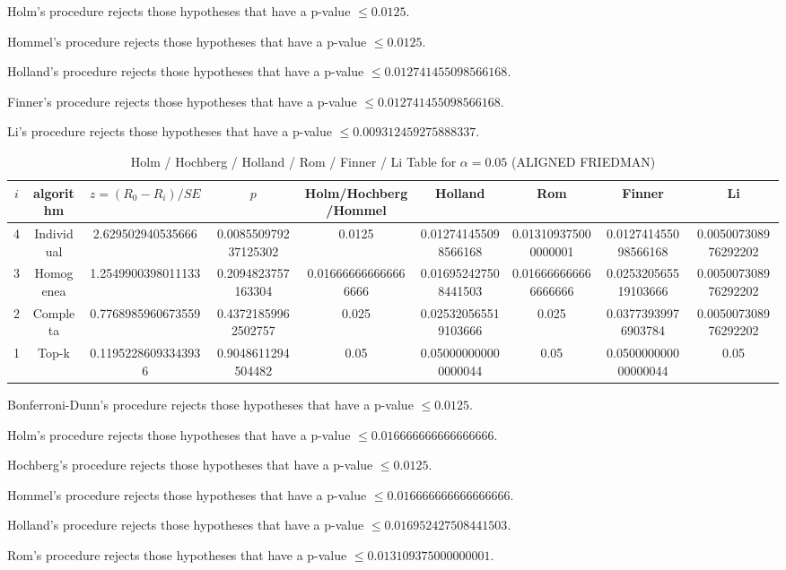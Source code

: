 \documentclass[a4paper,10pt]{article}
\begin{document}
\begin{landscape}
Holm's procedure rejects those hypotheses that have a p-value $\le0.0125$.


Hommel's procedure rejects those hypotheses that have a p-value $\le0.0125$.


Holland's procedure rejects those hypotheses that have a p-value $\le0.012741455098566168$.


Finner's procedure rejects those hypotheses that have a p-value $\le0.012741455098566168$.


Li's procedure rejects those hypotheses that have a p-value $\le0.009312459275888337$.



\newpage

\begin{table}[!htp]
\centering\scriptsize
\caption{Holm / Hochberg / Holland / Rom / Finner / Li Table for $\alpha=0.05$ (ALIGNED FRIEDMAN)}
\begin{tabular}{ccccccccc}
$i$&algorithm&$z=(R_0 - R_i)/SE$&$p$&Holm/Hochberg/Hommel&Holland&Rom&Finner&Li\\
\hline
4&Individual&2.629502940535666&0.008550979237125302&0.0125&0.012741455098566168&0.013109375000000001&0.012741455098566168&0.005007308976292202\\
3&Homogenea&1.2549900398011133&0.2094823757163304&0.016666666666666666&0.016952427508441503&0.016666666666666666&0.025320565519103666&0.005007308976292202\\
2&Completa&0.7768985960673559&0.43721859962502757&0.025&0.025320565519103666&0.025&0.03773939976903784&0.005007308976292202\\
1&Top-k&0.11952286093343936&0.9048611294504482&0.05&0.050000000000000044&0.05&0.050000000000000044&0.05\\
\hline
\end{tabular}
\end{table}
Bonferroni-Dunn's procedure rejects those hypotheses that have a p-value $\le0.0125$.


Holm's procedure rejects those hypotheses that have a p-value $\le0.016666666666666666$.


Hochberg's procedure rejects those hypotheses that have a p-value $\le0.0125$.


Hommel's procedure rejects those hypotheses that have a p-value $\le0.016666666666666666$.


Holland's procedure rejects those hypotheses that have a p-value $\le0.016952427508441503$.


Rom's procedure rejects those hypotheses that have a p-value $\le0.013109375000000001$.



\end{landscape}
\end{document}

